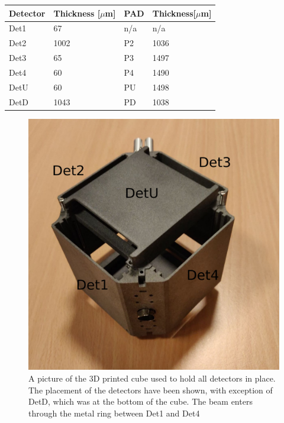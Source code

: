 \begin{table}[H]
	\centering
	\begin{tabular}{ll|ll}
		Detector & Thickness {[}$\mu$m{]} & PAD & Thickness{[}$\mu$m{]} \\ \hline
		Det1     & 67                     & n/a & n/a                   \\
		Det2     & 1002                   & P2  & 1036                  \\
		Det3     & 65                     & P3  & 1497                  \\
		Det4     & 60                     & P4  & 1490                  \\
		DetU     & 60                     & PU  & 1498                  \\
		DetD     & 1043                   & PD  & 1038                 
	\end{tabular}
\end{table}

\begin{figure}[h]
	\centering
	\includegraphics[width=.6\linewidth]{../figures/cubepic.pdf}
	\caption{A picture of the 3D printed cube used to hold all detectors in place. The placement of the detectors have been shown, with exception of DetD, which was at the bottom of the cube. The beam enters through the metal ring between Det1 and Det4}
	\label{fig:cubepic}
\end{figure}


